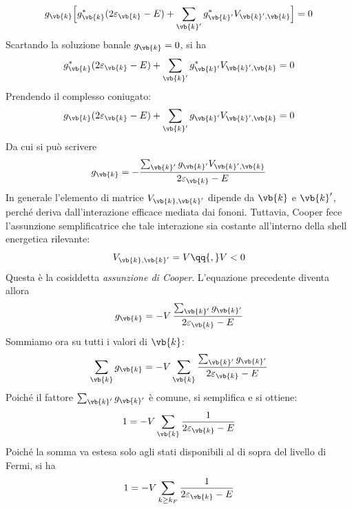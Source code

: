 \begin{equation*}
   g_{\vb{k}}
   \Big[
      g_{\vb{k}}^* (2 \varepsilon_{\vb{k}} - E)
      +
      \sum_{\vb{k}'} g_{\vb{k}'}^* V_{\vb{k}',\vb{k}}
   \Big]
   = 0
\end{equation*}
Scartando la soluzione banale $g_{\vb{k}} = 0$, si ha
\begin{equation*}
   g_{\vb{k}}^* (2 \varepsilon_{\vb{k}} - E)
   +
   \sum_{\vb{k}'} g_{\vb{k}'}^* V_{\vb{k}',\vb{k}}
   = 0
\end{equation*}
Prendendo il complesso coniugato:
\begin{equation*}
   g_{\vb{k}} (2 \varepsilon_{\vb{k}} - E)
   +
   \sum_{\vb{k}'} g_{\vb{k}'} V_{\vb{k}',\vb{k}}
   = 0
\end{equation*}
Da cui si può scrivere
\begin{equation*}
   g_{\vb{k}}
   =
   - \frac{\sum_{\vb{k}'} g_{\vb{k}'} V_{\vb{k}',\vb{k}}}{2 \varepsilon_{\vb{k}} - E}
\end{equation*}
In generale l'elemento di matrice $V_{\vb{k},\vb{k}'}$ dipende da $\vb{k}$ e $\vb{k}'$, perché deriva dall'interazione efficace mediata dai fononi. Tuttavia, Cooper fece l'assunzione semplificatrice che tale interazione sia costante all'interno della shell energetica rilevante:
\begin{equation*}
   V_{\vb{k},\vb{k}'}=V
   \qq{,}
   V<0
\end{equation*}
Questa è la cosiddetta \emph{assunzione di Cooper}. L'equazione precedente diventa allora
\begin{equation*}
   g_{\vb{k}}
   =-V\,\frac{\sum_{\vb{k}'} g_{\vb{k}'}}{2\varepsilon_{\vb{k}}-E}
\end{equation*}
Sommiamo ora su tutti i valori di $\vb{k}$:
\begin{equation*}
   \sum_{\vb{k}} g_{\vb{k}}
   =-V \sum_{\vb{k}} \frac{\sum_{\vb{k}'} g_{\vb{k}'}}{2\varepsilon_{\vb{k}}-E}
\end{equation*}
Poiché il fattore $\sum_{\vb{k}'} g_{\vb{k}'}$ è comune, si semplifica e si ottiene:
\begin{equation*}
   1
   =-V \sum_{\vb{k}} \frac{1}{2\varepsilon_{\vb{k}}-E}
\end{equation*}
Poiché la somma va estesa solo agli stati disponibili al di sopra del livello di Fermi, si ha
\begin{equation*}
   1
   =-V \sum_{k \ge k_F}
   \frac{1}{2\varepsilon_{\vb{k}}-E}
\end{equation*}
